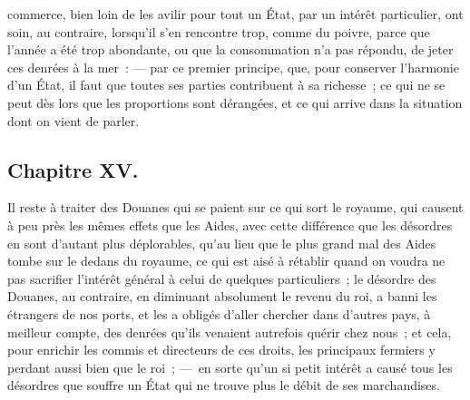 \documentclass[french,twoside]{book} %
\begin{document}
commerce, bien loin de les avilir pour tout un État, par un intérêt particulier, ont soin, au contraire, lorsqu’il s’en rencontre trop, comme du poivre, parce que l’année a été trop abondante, ou que la consommation n’a pas répondu, de jeter ces denrées à la mer : — par ce premier principe, que, pour conserver l’harmonie d’un État, il faut que toutes ses parties contribuent à sa richesse ; ce qui ne se peut dès lors que les proportions sont dérangées, et ce qui arrive dans la situation dont on vient de parler.
\subsection[{Chapitre XV.}]{Chapitre XV.}
\noindent Il reste à traiter des Douanes qui se paient sur ce qui sort le royaume, qui causent à peu près les mêmes effets que les Aides, avec cette différence que les désordres en sont d’autant plus déplorables, qu’au lieu que le plus grand mal des Aides tombe sur le dedans du royaume, ce qui est aisé à rétablir quand on voudra ne pas sacrifier l’intérêt général à celui de quelques particuliers ; le désordre des Douanes, au contraire, en diminuant absolument le revenu du roi, a banni les étrangers de nos ports, et les a obligés d’aller chercher dans d’autres pays, à meilleur compte, des denrées qu’ils venaient autrefois quérir chez nous ; et cela, pour enrichir les commis et directeurs de ces droits, les principaux fermiers y perdant aussi bien que le roi ; — en sorte qu’un si petit intérêt a causé tous les désordres que souffre un État qui ne trouve plus le débit de ses marchandises.\par
\end{document}
